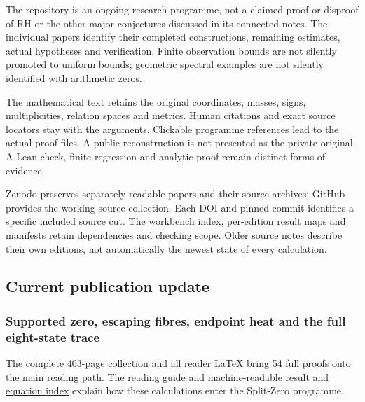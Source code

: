 \documentclass[
]{article}
\begin{document}
The repository is an ongoing research programme, not a claimed proof or
disproof of RH or the other major conjectures discussed in its connected
notes. The individual papers identify their completed constructions,
remaining estimates, actual hypotheses and verification. Finite
observation bounds are not silently promoted to uniform bounds;
geometric spectral examples are not silently identified with arithmetic
zeros.

The mathematical text retains the original coordinates, masses, signs,
multiplicities, relation spaces and metrics. Human citations and exact
source locators stay with the arguments.
\href{https://github.com/KokunoYumeto/zeta-function-research-reader/blob/666ee448d5ecb0bf8a4888f3a2aceaaa5c74d6d8/workbenches/splitzero-tandem/continuations/20260921-historical-proof-citations/REFERENCES.md}{Clickable
programme references} lead to the actual proof files. A public
reconstruction is not presented as the private original. A Lean check,
finite regression and analytic proof remain distinct forms of evidence.

Zenodo preserves separately readable papers and their source archives;
GitHub provides the working source collection. Each DOI and pinned
commit identifies a specific included source cut. The
\href{https://github.com/KokunoYumeto/zeta-function-research-reader/blob/main/WORKBENCHES.json}{workbench
index}, per-edition result maps and manifests retain dependencies and
checking scope. Older source notes describe their own editions, not
automatically the newest state of every calculation.

\subsection{Current publication
update}\label{current-publication-update}

\subsubsection{Supported zero, escaping fibres, endpoint heat and the
full eight-state
trace}\label{supported-zero-escaping-fibres-endpoint-heat-and-the-full-eight-state-trace}

The
\href{https://github.com/KokunoYumeto/zeta-function-research-reader/blob/main/workbenches/splitzero-tandem/branches/tau-zero-prime-positivity/TAU_ZERO_PRIME_POSITIVITY.pdf}{complete
403-page collection} and
\href{https://github.com/KokunoYumeto/zeta-function-research-reader/blob/main/workbenches/splitzero-tandem/branches/tau-zero-prime-positivity/TAU_ZERO_PRIME_POSITIVITY.tex}{all
reader LaTeX} bring 54 full proofs onto the main reading path. The
\href{https://github.com/KokunoYumeto/zeta-function-research-reader/blob/main/workbenches/splitzero-tandem/branches/tau-zero-prime-positivity/README.md}{reading
guide} and
\href{https://github.com/KokunoYumeto/zeta-function-research-reader/blob/main/workbenches/splitzero-tandem/branches/tau-zero-prime-positivity/PUBLICATION_INDEX.json}{machine-readable
result and equation index} explain how these calculations enter the
Split-Zero programme.
\end{document}
